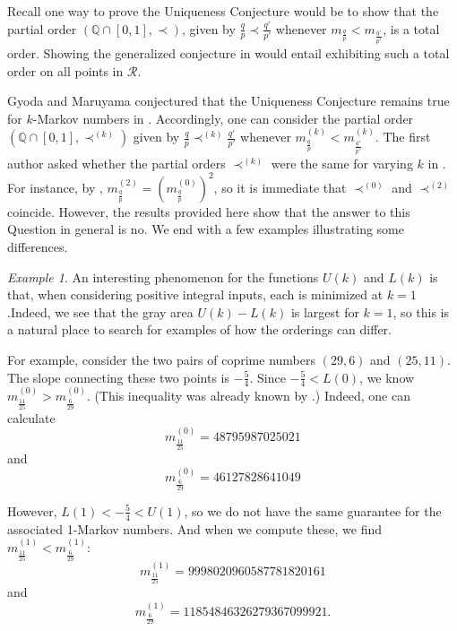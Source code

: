 \documentclass{article}
\theoremstyle{remark}
\newtheorem{example}[theorem]{Example}
\newcommand{\fqp}{\frac{q}{p}}
\begin{document}
Recall one way to prove the Uniqueness Conjecture would be to show that the partial order $(\mathbb{Q} \cap [0,1],\prec)$, given by $\fqp \prec \frac{q'}{p'}$ whenever $m_{\fqp} < m_{\frac{q'}{p'}}$, is a total order. Showing the generalized conjecture in \cite{LLRS} would entail exhibiting such a total order on all points in $\mathcal{R}$. 

Gyoda and Maruyama conjectured that the Uniqueness Conjecture remains true for $k$-Markov numbers in \cite[Conjecture 1.8] {gyoda2023uniqueness}. Accordingly, one can consider the partial order  $(\mathbb{Q} \cap [0,1],\prec^{(k)})$ given by $\fqp \prec^{(k)} \frac{q'}{p'}$ whenever $m^{(k)}_{\fqp} < m^{(k)}_{\frac{q'}{p'}}$. The first author asked whether the partial orders $\prec^{(k)}$ were the same for varying $k$ in \cite[Question 52]{banaian2025}. For instance, by \cite[Theorem 2.9]{gyoda2023uniqueness},  $m^{(2)}_{\fqp} = (m^{(0)}_{\fqp})^2$, so it is immediate that $\prec^{(0)}$ and $\prec^{(2)}$ coincide. However, the results provided here show that the answer to this Question in general is no. We end with a few examples illustrating some differences. 

\begin{example}
An interesting phenomenon for the functions $U(k)$ and $L(k)$ is that, when considering positive integral inputs, each is minimized at $k = 1$.Indeed, we see that the gray area $U(k)-L(k)$ is largest for $k =1$, so this is a natural place to search for examples of how the orderings can differ. 

For example, consider the two pairs of coprime numbers $(29,6)$ and $(25,11)$. The slope connecting these two points is $-\frac54$. Since $-\frac54 < L(0)$, we know $m^{(0)}_{\frac{11}{25}} > m^{(0)}_{\frac{6}{29}}$. (This inequality was already known by \cite[Theorem 1.2]{LLRS}.) Indeed, one can calculate \[
m^{(0)}_{\frac{11}{25}}  =  48795987025021 
\]
and
\[
m^{(0)}_{\frac{6}{29}}  =  46127828641049 
\]

However, $L(1) < -\frac54 < U(1)$, so we do not have the same guarantee for the associated 1-Markov numbers. And when we compute these, we find $m^{(1)}_{\frac{11}{25}} < m^{(1)}_{\frac{6}{29}}$:\[
m^{(1)}_{\frac{11}{25}}  =  9998020960587781820161
\]
and
\[
m^{(1)}_{\frac{6}{29}}  =  11854846326279367099921 .
\]
\end{example}
\end{document}
